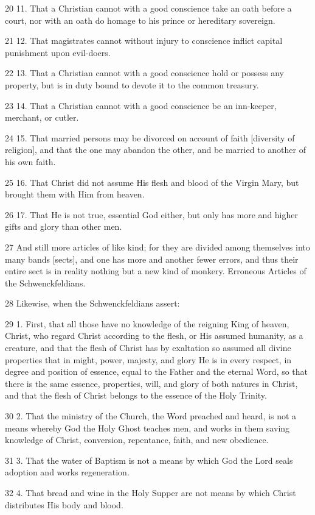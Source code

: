 {20 11. That a Christian cannot with a good conscience take an oath before a court, nor with an oath do homage to his prince or hereditary sovereign.

21 12. That magistrates cannot without injury to conscience inflict capital punishment upon evil-doers.

22 13. That a Christian cannot with a good conscience hold or possess any property, but is in duty bound to devote it to the common treasury.

23 14. That a Christian cannot with a good conscience be an inn-keeper, merchant, or cutler.

24 15. That married persons may be divorced on account of faith [diversity of religion], and that the one may abandon the other, and be married to another of his own faith.

25 16. That Christ did not assume His flesh and blood of the Virgin Mary, but brought them with Him from heaven.

26 17. That He is not true, essential God either, but only has more and higher gifts and glory than other men.

27 And still more articles of like kind; for they are divided among themselves into many bands [sects], and one has more and another fewer errors, and thus their entire sect is in reality nothing but a new kind of monkery.
Erroneous Articles of the Schwenckfeldians.

28 Likewise, when the Schwenckfeldians assert:

29 1. First, that all those have no knowledge of the reigning King of heaven, Christ, who regard Christ according to the flesh, or His assumed humanity, as a creature, and that the flesh of Christ has by exaltation so assumed all divine properties that in might, power, majesty, and glory He is in every respect, in degree and position of essence, equal to the Father and the eternal Word, so that there is the same essence, properties, will, and glory of both natures in Christ, and that the flesh of Christ belongs to the essence of the Holy Trinity.

30 2. That the ministry of the Church, the Word preached and heard, is not a means whereby God the Holy Ghost teaches men, and works in them saving knowledge of Christ, conversion, repentance, faith, and new obedience.

31 3. That the water of Baptism is not a means by which God the Lord seals adoption and works regeneration.

32 4. That bread and wine in the Holy Supper are not means by which Christ distributes His body and blood.

}
